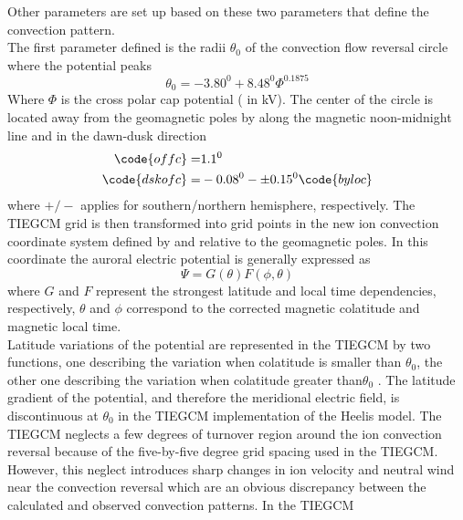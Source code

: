 \begin{enumerate}
\begin{enumerate}
Other parameters are set up based on these two
parameters that define the convection pattern. \\
%
The first parameter defined is the radii $\theta_0$ of the convection 
flow reversal circle where the potential peaks  
%
\begin{equation}
  \theta_0 = -3.80^0 + 8.48^0 \Phi^{0.1875}
    \label{eq:maginp_4}
\end{equation}
% 
Where $\Phi$ is the cross polar cap potential ( in kV). 
The center of the circle is located away from the geomagnetic 
poles by  along the magnetic noon-midnight line and  in the 
dawn-dusk direction  
%
\begin{equation}
  \begin{split}
     \code{offc}   =& 1.1^0 \\
     \code{dskofc} =& -0.08^0- \pm 0.15^0 \code{byloc}
  \end{split}
    \label{eq:maginp_5}
\end{equation}
% 
where $+/-$ applies for southern/northern hemisphere, respectively.
The TIEGCM grid is then
transformed into grid points in the new ion convection 
coordinate system defined by  and  relative to the 
geomagnetic poles. In this coordinate the auroral 
electric potential is generally expressed as
%
\begin{equation}
  \Psi = G(\theta)F(\phi, \theta)
    \label{eq:maginp_6}
\end{equation}
% 
where $G$ and $F$ represent the strongest latitude and local time 
dependencies, respectively, $\theta$ and $\phi$ correspond to the corrected 
magnetic colatitude and magnetic local time. \\
%
Latitude variations of the potential are represented in the 
TIEGCM by two functions, one describing the variation when 
colatitude is smaller than $\theta_0$, the other one describing the 
variation when colatitude greater than$\theta_0$ . The latitude 
gradient of the potential, and therefore the meridional 
electric field, is discontinuous at $\theta_0$ in the TIEGCM 
implementation of the Heelis model. The TIEGCM neglects a few 
degrees of turnover region around the ion convection reversal 
because of the five-by-five degree grid spacing used in the 
TIEGCM. However, this neglect introduces sharp changes in ion 
velocity and neutral wind near the convection reversal which are 
an obvious discrepancy between the calculated and observed 
convection patterns. In the TIEGCM
%

\end{enumerate}
\end{enumerate}
